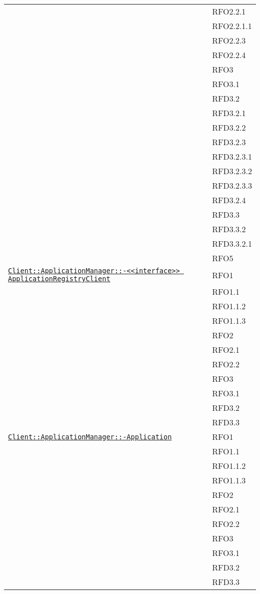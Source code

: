 \begin{longtable}{|>{\centering}m{10cm}|m{3cm}<{\centering}|}
& RFO2.2.1\\
& RFO2.2.1.1\\
& RFO2.2.3\\
& RFO2.2.4\\
& RFO3\\
& RFO3.1\\
& RFD3.2\\
& RFD3.2.1\\
& RFD3.2.2\\
& RFD3.2.3\\
& RFD3.2.3.1\\
& RFD3.2.3.2\\
& RFD3.2.3.3\\
& RFD3.2.4\\
& RFD3.3\\
& RFD3.3.2\\
& RFD3.3.2.1\\
& RFO5\\ \hline

\hyperref[Client::ApplicationManager::<<interface>> ApplicationRegistryClient]{\texttt{Client::ApplicationManager::-\linebreak <<interface>> ApplicationRegistryClient}} & RFO1\\
& RFO1.1\\
& RFO1.1.2\\
& RFO1.1.3\\
& RFO2\\
& RFO2.1\\
& RFO2.2\\
& RFO3\\
& RFO3.1\\
& RFD3.2\\
& RFD3.3\\ \hline

\hyperref[Client::ApplicationManager::Application]{\texttt{Client::ApplicationManager::-\linebreak Application}} & RFO1\\
& RFO1.1\\
& RFO1.1.2\\
& RFO1.1.3\\
& RFO2\\
& RFO2.1\\
& RFO2.2\\
& RFO3\\
& RFO3.1\\
& RFD3.2\\
& RFD3.3\\ \hline


\end{longtable}
